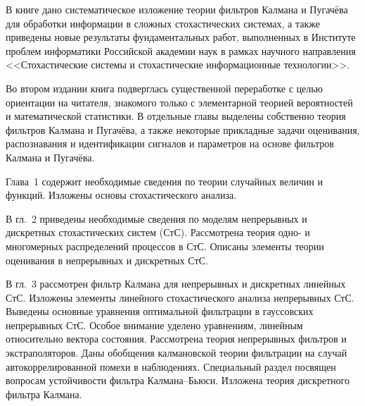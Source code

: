 \begin{multicols}{2}

 {\small

     В книге дано систематическое изложение теории фильтров Калмана и
Пугачёва для обработки информации в сложных стохастических системах, а также
приведены новые результаты фундаментальных работ, выполненных в Институте
проблем информатики Российской академии наук в рамках научного направления
<<Стохастические системы и стохастические информационные технологии>>.

     Во втором издании книга подверглась существенной переработке с целью
ориентации на читателя, знакомого только с элементарной теорией вероятностей и
математической статистики. В отдельные главы выделены собственно теория
фильтров Калмана и Пугачёва, а также некоторые прикладные задачи оценивания,
распознавания и идентификации сигналов и параметров на основе фильтров Калмана
и Пугачёва.

     Глава~1 содержит необходимые сведения по тео\-рии случайных величин и
функций. Изложены основы стохастического анализа.

     В гл.~2 приведены необходимые сведения по моделям непрерывных и
дискретных стохастических систем (СтС). Рассмотрена теория одно- и многомерных
распределений процессов в СтС. Описаны элементы теории оценивания в
непрерывных и дискретных СтС.

     В гл.~3 рассмотрен фильтр Калмана для непрерывных и дискретных
линейных СтС. Изложены элементы линейного стохастического анализа
непрерывных СтС. Выведены основные уравнения оптимальной фильтрации в
гауссовских непрерывных СтС. Особое внимание уделено уравнениям, линейным
относительно вектора состояния. Рассмотрена теория непрерывных фильтров и
экстраполяторов. Даны обобщения калмановской теории фильтрации на случай
автокоррелированной помехи в наблюдениях. Специальный раздел посвящен
вопросам устойчивости фильтра Калмана--Бьюси. Изложена теория дискретного
фильтра Калмана.

}
\end{multicols}
